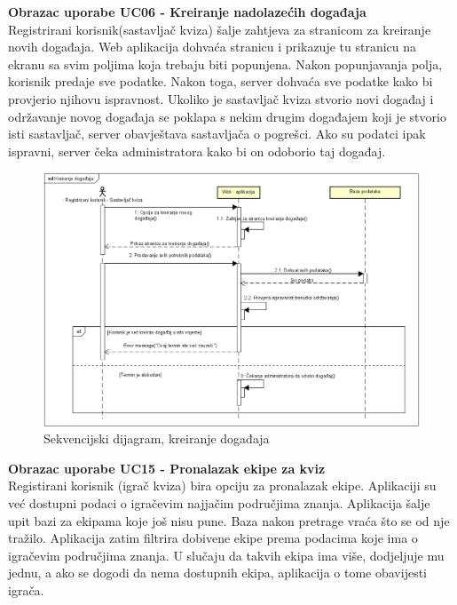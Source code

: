 				\textbf{Obrazac uporabe UC06 - Kreiranje nadolazećih događaja}\\
				
				Registrirani korisnik(sastavljač kviza) šalje zahtjeva za stranicom za kreiranje novih događaja. Web aplikacija dohvaća stranicu i prikazuje tu stranicu na ekranu sa svim poljima koja trebaju biti popunjena. Nakon popunjavanja polja, korisnik predaje sve podatke. Nakon toga, server dohvaća sve podatke kako bi provjerio njihovu ispravnost. Ukoliko je sastavljač kviza stvorio novi događaj i održavanje novog događaja se poklapa s nekim drugim događajem koji je stvorio isti sastavljač, server obavještava sastavljača o pogrešci. Ako su podatci ipak ispravni, server čeka administratora kako bi on odoborio taj događaj.
				
				\begin{figure}[H]
					\includegraphics[width=\textwidth]{dijagrami/SeqDiagram2.PNG} 
					\caption{Sekvencijski dijagram, kreiranje događaja}
					\label{fig:SeqDiagram2}
				\end{figure}
				
				\eject
				
				\textbf{Obrazac uporabe UC15 - Pronalazak ekipe za kviz}\\
				
				Registirani korisnik (igrač kviza) bira opciju za pronalazak ekipe. Aplikaciji su već dostupni podaci o igračevim najjačim područjima znanja. Aplikacija šalje upit bazi za ekipama koje još nisu pune. Baza nakon pretrage vraća što se od nje tražilo. Aplikacija zatim filtrira dobivene ekipe prema podacima koje ima o igračevim područjima znanja. U slučaju da takvih ekipa ima više, dodjeljuje mu jednu, a ako se dogodi da nema dostupnih ekipa, aplikacija o tome obavijesti igrača.
				
